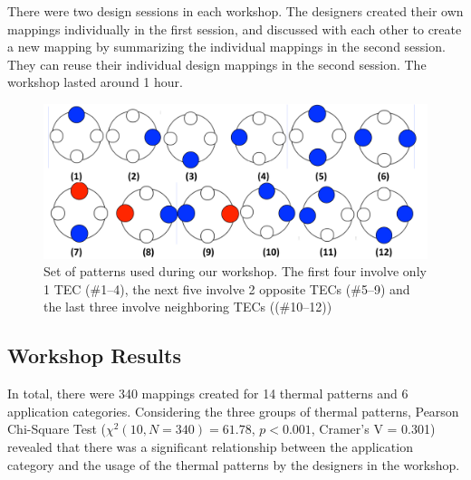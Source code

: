 \documentclass[preprint,12pt]{elsarticle}
\begin{document}
There were two design sessions in each workshop. The designers created their own mappings individually in the first session, and discussed with each other to create a new mapping by summarizing the individual mappings in the second session. They can reuse their individual design mappings in the second session. The workshop lasted around 1 hour.

\begin{figure}[tp]
  \centering
  \includegraphics[width=0.9\columnwidth]{img/fig-workshop.pdf}
  \caption{Set of patterns used during our workshop. The first four involve only 1 TEC (\#1--4), the next five involve 2 opposite TECs (\#5--9) and the last three involve neighboring TECs ((\#10--12))}
  \label{fig:workshop}
\end{figure}

\subsection{Workshop Results}
In total, there were 340 mappings created for 14 thermal patterns and 6 application categories. Considering the three groups of thermal patterns, Pearson Chi-Square Test (${\chi}^2(10, N=340) = 61.78$, $p < 0.001$, Cramer's V = 0.301) revealed that there was a significant relationship between the application category and the usage of the thermal patterns by the designers in the workshop.
%
\\
\end{document}
